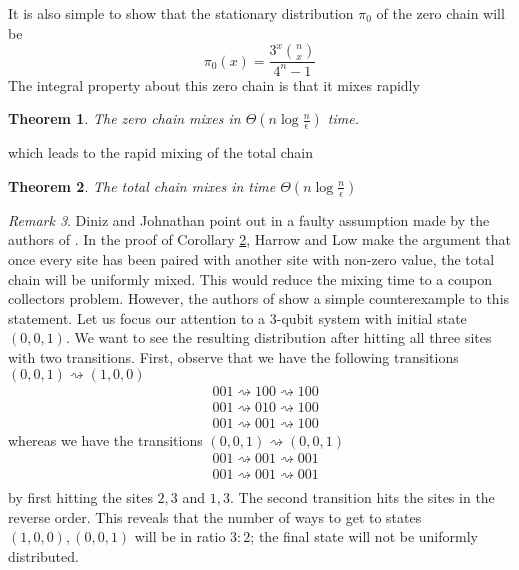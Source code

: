 \documentclass[12pt]{amsart}
\newtheorem{theorem}{Theorem}[section]
\theoremstyle{definition}
\theoremstyle{remark}
\newtheorem{remark}[theorem]{Remark}
\numberwithin{equation}{section}
\theoremstyle{remark}
\begin{document}
%
\noindent It is also simple to show that the stationary distribution $\pi_0$ of the zero chain will be
%
\begin{equation}
    \pi_0(x) = \frac{3^x{n \choose x}}{4^n - 1}
\end{equation}
%
The integral property about this zero chain is that it mixes rapidly
%
\begin{theorem} \label{zerochainmixing}
  The zero chain mixes in $\Theta(n\log\frac{n}{\epsilon})$ time.
\end{theorem}
%
\noindent which leads to the rapid mixing of the total chain
\begin{theorem} \label{totalchainmixing}
  The total chain mixes in time $\Theta(n \log\frac{n}{\epsilon})$
\end{theorem}
\begin{remark}
  Diniz and Johnathan point out in \cite{diniz} a faulty assumption made by the authors of \cite{harrlow}. In the proof of Corollary \ref{totalchainmixing}, Harrow and Low make the argument that once every site has been paired with another site with non-zero value, the total chain will be uniformly mixed. This would reduce the mixing time to a coupon collectors problem. However, the authors of \cite{diniz} show a simple counterexample to this statement. Let us focus our attention to a $3$-qubit system with initial state $(0,0,1)$. We want to see the resulting distribution after hitting all three sites with two transitions.
  First, observe that we have the following transitions $(0,0,1) \rightsquigarrow (1,0,0)$
  \begin{align*}
    & 001 \rightsquigarrow 100 \rightsquigarrow 100 \\
    & 001 \rightsquigarrow 010 \rightsquigarrow 100 \\
    & 001 \rightsquigarrow 001 \rightsquigarrow 100
  \end{align*}
  whereas we have the transitions $(0,0,1) \rightsquigarrow (0,0,1)$
  \begin{align*}
    & 001 \rightsquigarrow 001 \rightsquigarrow 001 \\
    & 001 \rightsquigarrow 001 \rightsquigarrow 001 \\
  \end{align*}
   by first hitting the sites $2,3$ and $1,3$. The second transition hits the sites in the reverse order. This reveals that the number of ways to get to states $(1,0,0),(0,0,1)$ will be in ratio $3:2$; the final state will not be uniformly distributed.
\end{remark}
\end{document}
